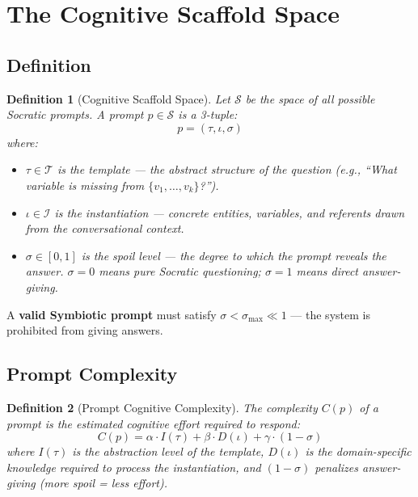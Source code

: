\documentclass[12pt,a4paper]{article}
\newtheorem{definition}{Definition}[section]
\theoremstyle{remark}
\newcommand{\CS}{\mathcal{S}}
\begin{document}
\section{The Cognitive Scaffold Space}

\subsection{Definition}

\begin{definition}[Cognitive Scaffold Space]
Let $\CS$ be the space of all possible Socratic prompts. A prompt $p \in \CS$ is a 3-tuple:
\begin{equation}
p = (\tau, \iota, \sigma)
\end{equation}
where:
\begin{itemize}
    \item $\tau \in \mathcal{T}$ is the \emph{template} — the abstract structure of the question (e.g., ``What variable is missing from $\{v_1, \ldots, v_k\}$?'').
    \item $\iota \in \mathcal{I}$ is the \emph{instantiation} — concrete entities, variables, and referents drawn from the conversational context.
    \item $\sigma \in [0,1]$ is the \emph{spoil level} — the degree to which the prompt reveals the answer. $\sigma = 0$ means pure Socratic questioning; $\sigma = 1$ means direct answer-giving.
\end{itemize}
\end{definition}

A \textbf{valid Symbiotic prompt} must satisfy $\sigma < \sigma_{\max} \ll 1$ — the system is prohibited from giving answers.

\subsection{Prompt Complexity}

\begin{definition}[Prompt Cognitive Complexity]
The complexity $C(p)$ of a prompt is the estimated cognitive effort required to respond:
\begin{equation}
C(p) = \alpha \cdot I(\tau) + \beta \cdot D(\iota) + \gamma \cdot (1 - \sigma)
\label{eq:complexity}
\end{equation}
where $I(\tau)$ is the abstraction level of the template, $D(\iota)$ is the domain-specific knowledge required to process the instantiation, and $(1 - \sigma)$ penalizes answer-giving (more spoil = less effort).
\end{definition}
\end{document}
